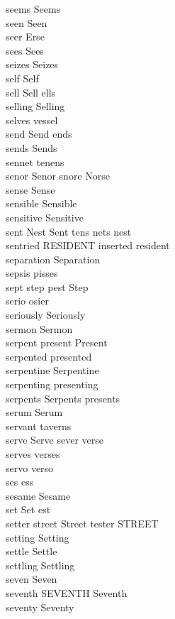 seems Seems\\
seen Seen\\
seer Erse\\
sees Sees\\
seizes Seizes\\
self Self\\
sell Sell ells\\
selling Selling\\
selves vessel\\
send Send ends\\
sends Sends\\
sennet tenens\\
senor Senor snore Norse\\
sense Sense\\
sensible Sensible\\
sensitive Sensitive\\
sent Nest Sent tens nets nest\\
sentried RESIDENT inserted resident\\
separation Separation\\
sepsis pisses\\
sept step pest Step\\
serio osier\\
seriously Seriously\\
sermon Sermon\\
serpent present Present\\
serpented presented\\
serpentine Serpentine\\
serpenting presenting\\
serpents Serpents presents\\
serum Serum\\
servant taverns\\
serve Serve sever verse\\
serves verses\\
servo verso\\
ses ess\\
sesame Sesame\\
set Set est\\
setter street Street tester STREET\\
setting Setting\\
settle Settle\\
settling Settling\\
seven Seven\\
seventh SEVENTH Seventh\\
seventy Seventy\\

